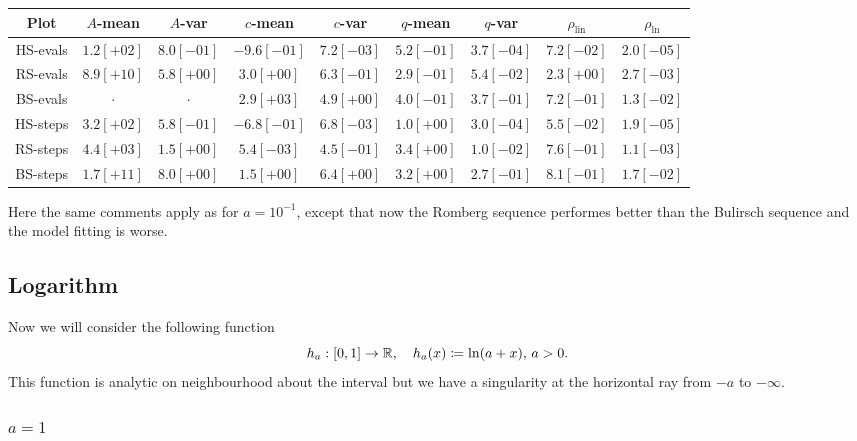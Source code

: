 \begin{table}[H]
    \centering
    \small
    \begin{tabular}{c||c|c|c|c|c|c|c|c}
Plot & \(A\)-mean & \(A\)-var & \(c\)-mean & \(c\)-var & \(q\)-mean & \(q\)-var & \(\rho_{\operatorname{lin}}\) & \(\rho_{\ln}\)\\\hline
\rowcolor{red}
HS-evals & \(1.2[+02]\) & \(8.0[-01]\) & \(-9.6[-01]\) & \(7.2[-03]\) & \(5.2[-01]\) & \(3.7[-04]\) & \(7.2[-02]\) & \(2.0[-05]\) \\
\rowcolor{red}
RS-evals & \(8.9[+10]\) & \(5.8[+00]\) & \(3.0[+00]\) & \(6.3[-01]\) & \(2.9[-01]\) & \(5.4[-02]\) & \(2.3[+00]\) & \(2.7[-03]\) \\
\rowcolor{red}
BS-evals & \(\cdot\) & \(\cdot\) & \(2.9[+03]\) & \(4.9[+00]\) & \(4.0[-01]\) & \(3.7[-01]\) & \(7.2[-01]\) & \(1.3[-02]\) \\
\rowcolor{red}
HS-steps & \(3.2[+02]\) & \(5.8[-01]\) & \(-6.8[-01]\) & \(6.8[-03]\) & \(1.0[+00]\) & \(3.0[-04]\) & \(5.5[-02]\) & \(1.9[-05]\) \\
\rowcolor{yellow}
RS-steps & \(4.4[+03]\) & \(1.5[+00]\) & \(5.4[-03]\) & \(4.5[-01]\) & \(3.4[+00]\) & \(1.0[-02]\) & \(7.6[-01]\) & \(1.1[-03]\) \\
\rowcolor{red}
BS-steps & \(1.7[+11]\) & \(8.0[+00]\) & \(1.5[+00]\) & \(6.4[+00]\) & \(3.2[+00]\) & \(2.7[-01]\) & \(8.1[-01]\) & \(1.7[-02]\) \\
    \end{tabular}
    \label{tab:my_label}
\end{table}

Here the same comments apply as for \(a = 10^{-1}\), except that now the Romberg sequence performes better than the Bulirsch sequence and the model fitting is worse. 

\subsection{Logarithm}

Now we will consider the following function 
\[
h_a: [0, 1] \rightarrow \mathbb{R}, \quad h_a(x) \coloneqq \ln(a + x),\, a > 0.
\]
This function is analytic on neighbourhood about the interval but we have a singularity at the horizontal ray from \(-a\) to \(-\infty\).

\subsubsection{\(a = 1\)}

